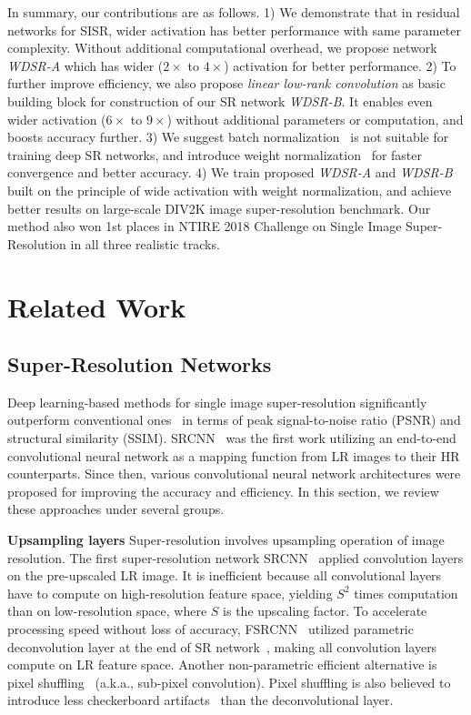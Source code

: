 \documentclass{article}
\begin{document}
In summary, our contributions are as follows. 1) We demonstrate that in residual networks for SISR, wider activation has better performance with same parameter complexity. Without additional computational overhead, we propose network \textit{WDSR-A} which has wider (\(2\times\) to \(4\times\)) activation for better performance. 2) To further improve efficiency, we also propose \textit{linear low-rank convolution} as basic building block for construction of our SR network \textit{WDSR-B}. It enables even wider activation (\(6\times\) to \(9\times\)) without additional parameters or computation, and boosts accuracy further. 3) We suggest batch normalization~\cite{ioffe2015batch} is not suitable for training deep SR networks, and introduce weight normalization~\cite{salimans2016weight} for faster convergence and better accuracy. 4) We train proposed \textit{WDSR-A} and \textit{WDSR-B} built on the principle of wide activation with weight normalization, and achieve better results on large-scale DIV2K image super-resolution benchmark. Our method also won 1st places in NTIRE 2018 Challenge on Single Image Super-Resolution in all three realistic tracks. 
\section{Related Work}

\subsection{Super-Resolution Networks}
Deep learning-based methods for single image super-resolution significantly outperform conventional ones~\cite{park2003super, yang2010image} in terms of peak signal-to-noise ratio (PSNR) and structural similarity (SSIM). SRCNN~\cite{dong2014learning} was the first work utilizing an end-to-end convolutional neural network as a mapping function from LR images to their HR counterparts. Since then, various convolutional neural network architectures were proposed for improving the accuracy and efficiency. In this section, we review these approaches under several groups.

\textbf{Upsampling layers} Super-resolution involves upsampling operation of image resolution. The first super-resolution network SRCNN~\cite{dong2014learning} applied convolution layers on the pre-upscaled LR image. It is inefficient because all convolutional layers have to compute on high-resolution feature space, yielding \(S^2\) times computation than on low-resolution space, where \(S\) is the upscaling factor. To accelerate processing speed without loss of accuracy, FSRCNN~\cite{dong2016accelerating} utilized parametric deconvolution layer at the end of SR network~\cite{dong2016accelerating}, making all convolution layers compute on LR feature space. Another non-parametric efficient alternative is pixel shuffling~\cite{shi2016real} (a.k.a., sub-pixel convolution). Pixel shuffling is also believed to introduce less checkerboard artifacts~\cite{odena2016deconvolution} than the deconvolutional layer.
\end{document}
